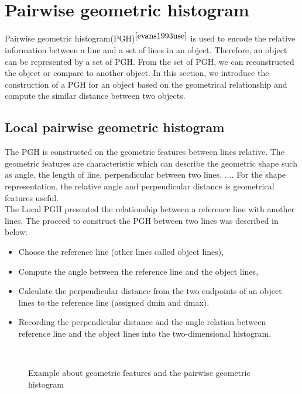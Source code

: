\section{Pairwise geometric histogram}
Pairwise geometric histogram(PGH)$^{\cite{evans1993use}}$ is used to encode the relative information between a line and a set of lines in an object. Therefore, an object can be represented by a set of PGH. From the set of PGH, we can reconstructed the object or compare to another object. In this section, we introduce the construction of a PGH for an object based on the geometrical relationship and compute the similar distance between two objects.

\subsection{Local pairwise geometric histogram}
The PGH is constructed on the geometric features between lines relative. The geometric features are characteristic which can describe the geometric shape such as angle, the length of line, perpendicular between two lines, .... For the shape representation, the relative angle and perpendicular distance is geometrical features useful. \\
The Local PGH presented the relationship between a reference line with another lines. The proceed to construct the PGH between two lines was described in below:
\begin{itemize}
\item Choose the reference line (other lines called object lines),
\item Compute the angle between the reference line and the object lines,
\item Calculate the perpendicular distance from the two endpoints of an object lines to the reference line (assigned dmin and dmax),
\item Recording the perpendicular distance and the angle relation between reference line and the object lines into the two-dimensional histogram.
\end{itemize}
\begin{figure}[h!]
\centering
{}~~
\caption{Example about geometric features and the pairwise geometric histogram}
\label{fig:figure_31}
\end{figure}~\\
